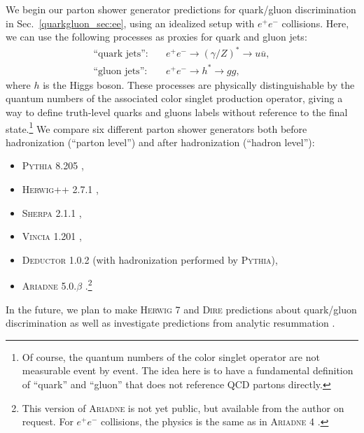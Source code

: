 \documentclass[11pt]{cernrep}
\begin{document}
We begin our parton shower generator predictions for quark/gluon discrimination in Sec.~\ref{quarkgluon_sec:ee}, using an idealized setup with $e^+e^-$ collisions.  Here, we can use the following processes as proxies for quark and gluon jets:
\begin{align}
\text{``quark jets''}: \quad & e^+e^- \to (\gamma/Z)^* \to u \overline{u}, \\
\text{``gluon jets''}: \quad & e^+e^- \to h^* \to g g,
\end{align}
where $h$ is the Higgs boson.  These processes are physically
distinguishable by the quantum numbers of the associated color singlet
production operator, giving a way to define truth-level quarks and
gluons labels without reference to the final state.\footnote{Of course, the quantum numbers of the color singlet operator are not measurable event by event.  The idea here is to have a fundamental definition of ``quark'' and ``gluon'' that does not reference QCD partons directly.}  We
compare six different parton shower generators both before
hadronization (``parton level'') and after hadronization (``hadron
level''):
\begin{itemize}
\item \textsc{Pythia 8.205} \cite{Sjostrand:2006za,Sjostrand:2014zea},
\item \textsc{Herwig++ 2.7.1} \cite{Bahr:2008pv,Bellm:2013hwb},
\item \textsc{Sherpa 2.1.1} \cite{Gleisberg:2008ta},
\item \textsc{Vincia 1.201} \cite{Giele:2013ema},
\item \textsc{Deductor 1.0.2} \cite{Nagy:2014mqa} (with hadronization performed by \textsc{Pythia}),
\item \textsc{Ariadne 5.0.$\beta$} \cite{Flensburg:2011kk}.\footnote{This version of \textsc{Ariadne} is not yet public, but available from the author on request.  For $e^+ e^-$ collisions, the physics is the same as in \textsc{Ariadne 4} \cite{Lonnblad:1992tz}.}
\end{itemize}
In the future, we plan to make \textsc{Herwig 7} \cite{Bellm:2015jjp} and \textsc{Dire} \cite{Hoche:2015sya} predictions about quark/gluon discrimination as well as investigate predictions from analytic resummation \cite{Larkoski:2013eya,Larkoski:2014pca}.
\end{document}

